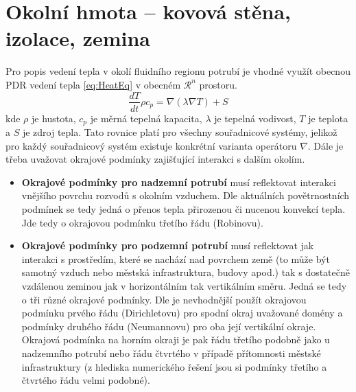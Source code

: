 \section{Okolní hmota – kovová stěna, izolace, zemina}
\label{sec:SurroundingMass}
Pro popis vedení tepla v okolí fluidního regionu potrubí je vhodné využít
obecnou PDR vedení tepla \ref{eq:HeatEq} v obecném \(\mathcal{R}^n\) prostoru.
\begin{equation}
  \label{eq:HeatEq}
  \frac{dT}{dt}\rho{c_p}=\nabla(\lambda\nabla{T})+S
\end{equation}
kde \(\rho\) je hustota, \(c_p\) je měrná tepelná kapacita, \(\lambda\) je
tepelná vodivost, \(T\) je teplota a \(S\) je zdroj tepla. Tato rovnice platí
pro všechny souřadnicové systémy, jelikož pro každý souřadnicový systém
existuje konkrétní varianta operátoru \(\nabla\). Dále je třeba uvažovat
okrajové podmínky zajišťující interakci s dalším okolím.
\begin{itemize}
  \item
    \textbf{Okrajové podmínky pro nadzemní potrubí} musí reflektovat interakci
    vnějšího povrchu rozvodů s okolním vzduchem. Dle aktuálních povětrnostních
    podmínek se tedy jedná o přenos tepla přirozenou či nucenou
    konvekcí tepla. Jde tedy o okrajovou podmínku třetího řádu (Robinovu).
  \item
    \textbf{Okrajové podmínky pro podzemní potrubí} musí reflektovat jak
    interakci s prostředím, které se nachází nad povrchem země (to může být
    samotný vzduch nebo městská infrastruktura, budovy apod.) tak s dostatečně
    vzdálenou zeminou jak v horizontálním tak vertikálním směru. Jedná se tedy
    o tři různé okrajové podmínky. Dle \cite{danielewicz2016172} je nevhodnější
    použít okrajovou podmínku prvého řádu (Dirichletovu) pro spodní okraj
    uvažované domény a podmínky druhého řádu (Neumannovu) pro oba její
    vertikální okraje. Okrajová podmínka na horním okraji je pak řádu třetího
    podobně jako u nadzemního potrubí nebo řádu čtvrtého v případě přítomnosti
    městské infrastruktury (z hlediska numerického řešení jsou si podmínky
    třetího a čtvrtého řádu velmi podobné).
\end{itemize}


